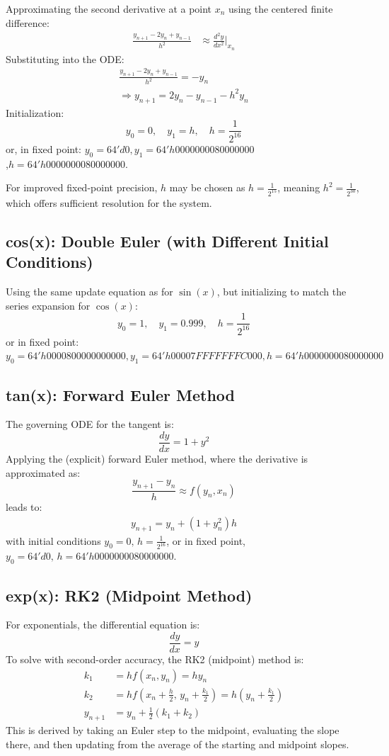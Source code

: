 \documentclass[conference]{IEEEtran}
\begin{document}
\begin{FlushLeft}
\begin{flushleft}
Approximating the second derivative at a point \(x_n\) using the centered finite difference:
\begin{align*}
	\frac{y_{n+1} - 2y_n + y_{n-1}}{h^2} &\approx \frac{d^2 y}{dx^2}\bigg|_{x_n} 
\end{align*}
Substituting into the ODE:
\begin{align*}
	\frac{y_{n+1} - 2y_n + y_{n-1}}{h^2} = -y_n \\
	\Rightarrow y_{n+1} = 2y_n - y_{n-1} - h^2 y_n
\end{align*}
Initialization: 
\[
y_0 = 0, \quad y_1 = h, \quad h = \frac{1}{2^{16}}
\]
or, in fixed point: $ y_0 = 64'd0, y_1 = 64'h0000000080000000$\\ 
,$h = 64'h0000000080000000 $.

For improved fixed-point precision, \(h\) may be chosen as \(h = \frac{1}{2^{15}}\), meaning \(h^2 = \frac{1}{2^{30}}\), which offers sufficient resolution for the system.

\subsection{cos(x): Double Euler (with Different Initial Conditions)}
Using the same update equation as for \(\sin(x)\), but initializing to match the series expansion for \(\cos(x)\):
\[
y_0 = 1, \quad y_1 = 0.999, \quad h = \frac{1}{2^{16}}
\]
or in fixed point:
$
y_0 = 64'h0000800000000000, y_1 = 64'h00007FFFFFFFC000, h = 64'h0000000080000000
$

\subsection{tan(x): Forward Euler Method}
The governing ODE for the tangent is:
\[
\frac{dy}{dx} = 1 + y^2
\]
Applying the (explicit) forward Euler method, where the derivative is approximated as:
\[
\frac{y_{n+1} - y_n}{h} \approx f(y_n, x_n)
\]
leads to:
\begin{align*}
	y_{n+1} = y_n + (1 + y_n^2)h
\end{align*}
with initial conditions \( y_0 = 0,\, h = \frac{1}{2^{16}} \), or in fixed point, \( y_0 = 64'd0,\, h = 64'h0000000080000000 \).

\subsection{exp(x): RK2 (Midpoint Method)}
For exponentials, the differential equation is:
\[
\frac{dy}{dx} = y
\]
To solve with second-order accuracy, the RK2 (midpoint) method is:
\begin{align*}
	k_1 &= h f(x_n, y_n) = h y_n \\
	k_2 &= h f\left(x_n + \frac{h}{2}, \, y_n + \frac{k_1}{2}\right) = h(y_n + \frac{k_1}{2}) \\
	y_{n+1} &= y_n + \frac{1}{2}(k_1 + k_2)
\end{align*}
This is derived by taking an Euler step to the midpoint, evaluating the slope there, and then updating from the average of the starting and midpoint slopes.


\end{flushleft}
\end{FlushLeft}
\end{document}
